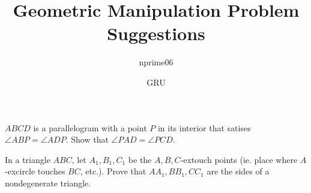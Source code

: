 \documentclass[mast]{lucky}
\title{Geometric Manipulation Problem Suggestions}
\author{nprime06}
\date{GRU}
\begin{document}
\maketitle

\begin{prob}[nprime06]{}
$ABCD$ is a parallelogram with a point $P$ in its interior that satises $\angle ABP = \angle ADP$. Show that $\angle PAD = \angle PCD$.
\end{prob}

\begin{prob}[Tuymaada 2005]{}
In a triangle $ABC$, let $A_1,B_1,C_1$ be the $A,B,C$-extouch points (ie. place where $A$-excircle touches $BC$, etc.). Prove that $AA_1,BB_1,CC_1$ are the sides of a nondegenerate triangle. 
\end{prob}
\end{document}
